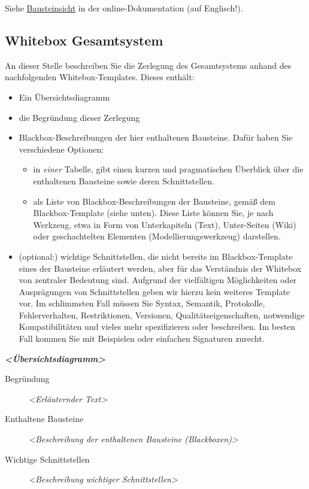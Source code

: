 \documentclass[a4paper,12pt]{article}
\begin{document}
Siehe \href{https://docs.arc42.org/section-5/}{Bausteinsicht} in der
online-Dokumentation (auf Englisch!).

\subsection{Whitebox Gesamtsystem}\label{_whitebox_gesamtsystem}

An dieser Stelle beschreiben Sie die Zerlegung des Gesamtsystems anhand
des nachfolgenden Whitebox-Templates. Dieses enthält:

\begin{itemize}
\item
  Ein Übersichtsdiagramm
\item
  die Begründung dieser Zerlegung
\item
  Blackbox-Beschreibungen der hier enthaltenen Bausteine. Dafür haben
  Sie verschiedene Optionen:

  \begin{itemize}
  \item
    in \emph{einer} Tabelle, gibt einen kurzen und pragmatischen
    Überblick über die enthaltenen Bausteine sowie deren Schnittstellen.
  \item
    als Liste von Blackbox-Beschreibungen der Bausteine, gemäß dem
    Blackbox-Template (siehe unten). Diese Liste können Sie, je nach
    Werkzeug, etwa in Form von Unterkapiteln (Text), Unter-Seiten (Wiki)
    oder geschachtelten Elementen (Modellierungswerkzeug) darstellen.
  \end{itemize}
\item
  (optional:) wichtige Schnittstellen, die nicht bereits im
  Blackbox-Template eines der Bausteine erläutert werden, aber für das
  Verständnis der Whitebox von zentraler Bedeutung sind. Aufgrund der
  vielfältigen Möglichkeiten oder Ausprägungen von Schnittstellen geben
  wir hierzu kein weiteres Template vor. Im schlimmsten Fall müssen Sie
  Syntax, Semantik, Protokolle, Fehlerverhalten, Restriktionen,
  Versionen, Qualitätseigenschaften, notwendige Kompatibilitäten und
  vieles mehr spezifizieren oder beschreiben. Im besten Fall kommen Sie
  mit Beispielen oder einfachen Signaturen zurecht.
\end{itemize}

\emph{\textbf{\textless Übersichtsdiagramm\textgreater{}}}

\begin{description}
\item[Begründung]
\emph{\textless Erläuternder Text\textgreater{}}
\item[Enthaltene Bausteine]
\emph{\textless Beschreibung der enthaltenen Bausteine
(Blackboxen)\textgreater{}}
\item[Wichtige Schnittstellen]
\emph{\textless Beschreibung wichtiger Schnittstellen\textgreater{}}
\end{description}
\end{document}
